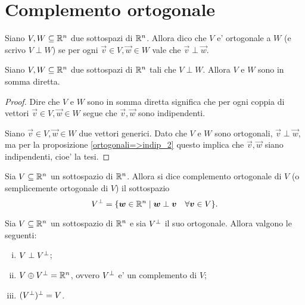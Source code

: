 \section{Complemento ortogonale}

\begin{definition}
    Siano $V, W \subseteq \mathbb{R}^n$ due sottospazi di $\mathbb{R}^n$. Allora dico che $V$ e' ortogonale a $W$ (e scrivo $V \perp W$) se per ogni $\vec v \in V, \vec w \in W$ vale che $\vec v \perp \vec w$.
\end{definition}

\begin{proposition}
    Siano $V, W \subseteq \mathbb{R}^n$ due sottospazi di $\mathbb{R}^n$ tali che $V \perp W$. Allora $V$ e $W$ sono in somma diretta.
\end{proposition}
\begin{proof}
    Dire che $V$ e $W$ sono in somma diretta significa che per ogni coppia di vettori $\vec v \in V, \vec w \in W$ segue che $\vec{v}, \vec w$ sono indipendenti.

    Siano $\vec v \in V, \vec w \in W$ due vettori generici. Dato che $V$ e $W$ sono ortogonali, $\vec v \perp \vec w$, ma per la proposizione \ref{ortogonali=>indip_2} questo implica che $\vec v, \vec w$ siano indipendenti, cioe' la tesi.
\end{proof}

\begin{definition}
    Sia $V \subseteq \mathbb{R}^n$ un sottospazio di $\mathbb{R}^n$. Allora si dice complemento ortogonale di $V$ (o semplicemente ortogonale di $V$) il sottospazio \[
        V^{\perp} = \{\bm{w} \in \mathbb{R}^n \mid \bm{w} \perp \bm{v} \quad \forall \bm{v} \in V\}.  
    \]
\end{definition}

\begin{proposition}
    Sia $V \subseteq \mathbb{R}^n$ un sottospazio di $\mathbb{R}^n$ e sia $V^{\perp}$ il suo ortogonale. Allora valgono le seguenti:
    \begin{enumerate}[(i)]
        \item $V \perp V^{\perp}$;
        \item $V \oplus V^{\perp} = \mathbb{R}^n$, ovvero $V^{\perp}$ e' un complemento di $V$;
        \item $(V^{\perp})^{\perp} = V$.
    \end{enumerate}
\end{proposition}

